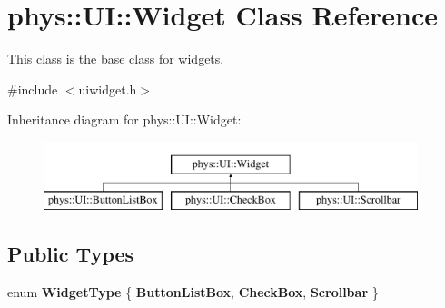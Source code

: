 \hypertarget{classphys_1_1UI_1_1Widget}{
\section{phys::UI::Widget Class Reference}
\label{d9/d48/classphys_1_1UI_1_1Widget}
}


This class is the base class for widgets.  




{\ttfamily \#include $<$uiwidget.h$>$}

Inheritance diagram for phys::UI::Widget:\begin{figure}[H]
\begin{center}
\leavevmode
\includegraphics[height=2.000000cm]{d9/d48/classphys_1_1UI_1_1Widget}
\end{center}
\end{figure}
\subsection*{Public Types}
\begin{DoxyCompactItemize}
\item 
enum {\bfseries WidgetType} \{ {\bfseries ButtonListBox}, 
{\bfseries CheckBox}, 
{\bfseries Scrollbar}
 \}
\end{DoxyCompactItemize}
